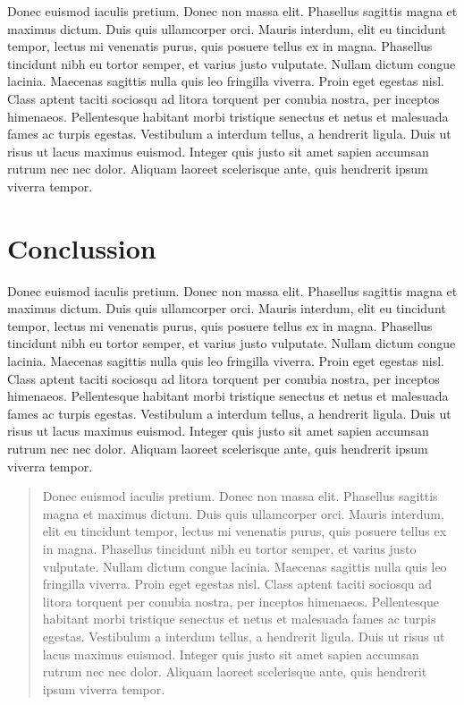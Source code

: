 \documentclass[format=acmsmall, review=false, screen=true]{acmart}
\begin{document}
Donec euismod iaculis pretium. Donec non massa elit. Phasellus sagittis magna et maximus dictum. Duis quis ullamcorper orci. Mauris interdum, elit eu tincidunt tempor, lectus mi venenatis purus, quis posuere tellus ex in magna. Phasellus tincidunt nibh eu tortor semper, et varius justo vulputate. Nullam dictum congue lacinia. Maecenas sagittis nulla quis leo fringilla viverra. Proin eget egestas nisl. Class aptent taciti sociosqu ad litora torquent per conubia nostra, per inceptos himenaeos. Pellentesque habitant morbi tristique senectus et netus et malesuada fames ac turpis egestas. Vestibulum a interdum tellus, a hendrerit ligula. Duis ut risus ut lacus maximus euismod. Integer quis justo sit amet sapien accumsan rutrum nec nec dolor. Aliquam laoreet scelerisque ante, quis hendrerit ipsum viverra tempor.

\section{Conclussion}

Donec euismod iaculis pretium. Donec non massa elit. Phasellus sagittis magna et maximus dictum. Duis quis ullamcorper orci. Mauris interdum, elit eu tincidunt tempor, lectus mi venenatis purus, quis posuere tellus ex in magna. Phasellus tincidunt nibh eu tortor semper, et varius justo vulputate. Nullam dictum congue lacinia. Maecenas sagittis nulla quis leo fringilla viverra. Proin eget egestas nisl. Class aptent taciti sociosqu ad litora torquent per conubia nostra, per inceptos himenaeos. Pellentesque habitant morbi tristique senectus et netus et malesuada fames ac turpis egestas. Vestibulum a interdum tellus, a hendrerit ligula. Duis ut risus ut lacus maximus euismod. Integer quis justo sit amet sapien accumsan rutrum nec nec dolor. Aliquam laoreet scelerisque ante, quis hendrerit ipsum viverra tempor.

\renewcommand{\abstractname}{Acknowledgements}
\begin{abstract}
Donec euismod iaculis pretium. Donec non massa elit. Phasellus sagittis magna et maximus dictum. Duis quis ullamcorper orci. Mauris interdum, elit eu tincidunt tempor, lectus mi venenatis purus, quis posuere tellus ex in magna. Phasellus tincidunt nibh eu tortor semper, et varius justo vulputate. Nullam dictum congue lacinia. Maecenas sagittis nulla quis leo fringilla viverra. Proin eget egestas nisl. Class aptent taciti sociosqu ad litora torquent per conubia nostra, per inceptos himenaeos. Pellentesque habitant morbi tristique senectus et netus et malesuada fames ac turpis egestas. Vestibulum a interdum tellus, a hendrerit ligula. Duis ut risus ut lacus maximus euismod. Integer quis justo sit amet sapien accumsan rutrum nec nec dolor. Aliquam laoreet scelerisque ante, quis hendrerit ipsum viverra tempor.
\end{abstract}
\end{document}
